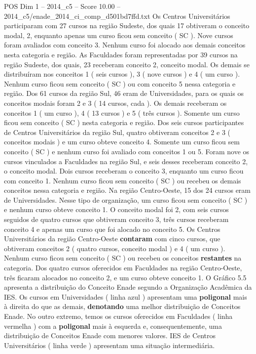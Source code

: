 \begin{textsample}{POS Dim 1 – 2014\_c5 – Score 10.00 – 2014\_c5/enade\_2014\_ci\_comp\_d501bd7ffd.txt}
Os Centros Universitários participaram com 27 cursos na região Sudeste, dos quais 17 obtiveram o conceito modal, 2, enquanto apenas um curso ficou sem conceito ( SC ).
Nove cursos foram avaliados com conceito 3.
Nenhum curso foi alocado aos demais conceitos nesta categoria e região.
As Faculdades foram representadas por 39 cursos na região Sudeste, dos quais, 23 receberam conceito 2, conceito modal.
Os demais se distribuíram nos conceitos 1 ( seis cursos ), 3 ( nove cursos ) e 4 ( um curso ).
Nenhum curso ficou sem conceito ( SC ) ou com conceito 5 nessa categoria e região.
Dos 61 cursos da região Sul, 46 eram de Universidades, para os quais os conceitos modais foram 2 e 3 ( 14 cursos, cada ).
Os demais receberam os conceitos 1 ( um curso ), 4 ( 13 cursos ) e 5 ( três cursos ).
Somente um curso ficou sem conceito ( SC ) nesta categoria e região.
Dos seis cursos participantes de Centros Universitários da região Sul, quatro obtiveram conceitos 2 e 3 ( conceitos modais ) e um curso obteve conceito 4.
Somente um curso ficou sem conceito ( SC ) e nenhum curso foi avaliado com conceitos 1 ou 5.
Foram nove os cursos vinculados a Faculdades na região Sul, e seis desses receberam conceito 2, o conceito modal.
Dois cursos receberam o conceito 3, enquanto um curso ficou com conceito 1.
Nenhum curso ficou sem conceito ( SC ) ou recebeu os demais conceitos nessa categoria e região.
Na região Centro-Oeste, 15 dos 24 cursos eram de Universidades.
Nesse tipo de organização, um curso ficou sem conceito ( SC ) e nenhum curso obteve conceito 1.
O conceito modal foi 2, com seis cursos seguidos de quatro cursos que obtiveram conceito 3, três cursos receberam conceito 4 e apenas um curso que foi alocado no conceito 5.
Os Centros Universitários da região Centro-Oeste \textbf{contaram} com cinco cursos, que obtiveram conceitos 2 ( quatro cursos, conceito modal ) e 4 ( um curso ).
Nenhum curso ficou sem conceito ( SC ) ou recebeu os conceitos \textbf{restantes} na categoria.
Dos quatro cursos oferecidos em Faculdades na região Centro-Oeste, três ficaram alocados no conceito 2, e um curso obteve conceito 1.
O Gráfico 5.5 apresenta a distribuição do Conceito Enade segundo a Organização Acadêmica da IES.
Os cursos em Universidades ( linha azul ) apresentam uma \textbf{poligonal} mais à direita do que as demais, \textbf{denotando} uma melhor distribuição de Conceitos Enade.
No outro extremo, temos os cursos oferecidos em Faculdades ( linha vermelha ) com a \textbf{poligonal} mais à esquerda e, consequentemente, uma distribuição de Conceitos Enade com menores valores.
IES de Centros Universitários ( linha verde ) apresentam uma situação intermediária.

\end{textsample}
